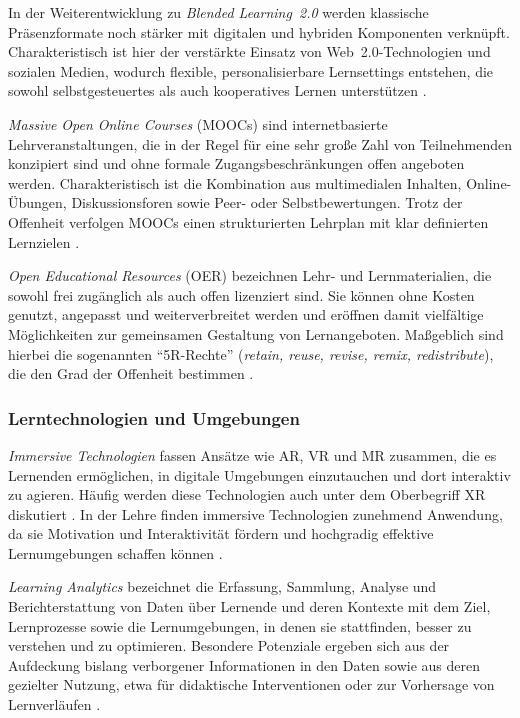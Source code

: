 In der Weiterentwicklung zu \textit{Blended Learning~2.0} werden klassische Präsenzformate noch stärker mit digitalen und hybriden Komponenten verknüpft. Charakteristisch ist hier der verstärkte Einsatz von Web~2.0-Technologien und sozialen Medien, wodurch flexible, personalisierbare Lernsettings entstehen, die sowohl selbstgesteuertes als auch kooperatives Lernen unterstützen \parencites{seufert_schulleitertagung_2014}{news_aktuell_gmbh_e-learning_2025}.

\textit{Massive Open Online Courses} (MOOCs) sind internetbasierte Lehrveranstaltungen, die in der Regel für eine sehr große Zahl von Teilnehmenden konzipiert sind und ohne formale Zugangsbeschränkungen offen angeboten werden. Charakteristisch ist die Kombination aus multimedialen Inhalten, Online-Übungen, Diskussionsforen sowie Peer- oder Selbstbewertungen. Trotz der Offenheit verfolgen MOOCs einen strukturierten Lehrplan mit klar definierten Lernzielen \parencites[S.~5]{yuan_moocs_2013}[S.~204]{liyanagunawardena_moocs_2013}.

\textit{Open Educational Resources} (OER) bezeichnen Lehr- und Lernmaterialien, die sowohl frei zugänglich als auch offen lizenziert sind. Sie können ohne Kosten genutzt, angepasst und weiterverbreitet werden und eröffnen damit vielfältige Möglichkeiten zur gemeinsamen Gestaltung von Lernangeboten. Maßgeblich sind hierbei die sogenannten \enquote{5R-Rechte} (\textit{retain, reuse, revise, remix, redistribute}), die den Grad der Offenheit bestimmen \parencite[S.~134f]{wiley_defining_2018}.

\subsubsection{Lerntechnologien und Umgebungen}

\textit{Immersive Technologien} fassen Ansätze wie \ac{AR}, \ac{VR} und \ac{MR} zusammen, die es Lernenden ermöglichen, in digitale Umgebungen einzutauchen und dort interaktiv zu agieren. Häufig werden diese Technologien auch unter dem Oberbegriff \ac{XR} diskutiert \parencites[S.~82]{alnagrat_review_2022}[S.~256]{chen_information_2024}. In der Lehre finden immersive Technologien zunehmend Anwendung, da sie Motivation und Interaktivität fördern und hochgradig effektive Lernumgebungen schaffen können \parencite[S.~1]{izouaouen_education_2025}.

\textit{Learning Analytics} bezeichnet die Erfassung, Sammlung, Analyse und Berichterstattung von Daten über Lernende und deren Kontexte mit dem Ziel, Lernprozesse sowie die Lernumgebungen, in denen sie stattfinden, besser zu verstehen und zu optimieren. Besondere Potenziale ergeben sich aus der Aufdeckung bislang verborgener Informationen in den Daten sowie aus deren gezielter Nutzung, etwa für didaktische Interventionen oder zur Vorhersage von Lernverläufen \parencite[S.~294]{xiao_applying_2019}.


